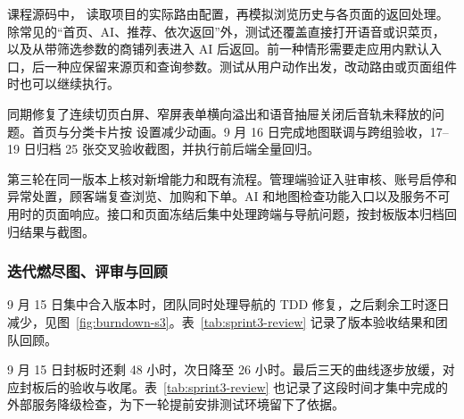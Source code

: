 课程源码中， 读取项目的实际路由配置，再模拟浏览历史与各页面的返回处理。除常见的“首页、AI、推荐、依次返回”外，测试还覆盖直接打开语音或识菜页，以及从带筛选参数的商铺列表进入 AI 后返回。前一种情形需要走应用内默认入口，后一种应保留来源页和查询参数。测试从用户动作出发，改动路由或页面组件时也可以继续执行。

同期修复了连续切页白屏、窄屏表单横向溢出和语音抽屉关闭后音轨未释放的问题。首页与分类卡片按  设置减少动画。9 月 16 日完成地图联调与跨组验收，17--19 日归档 25 张交叉验收截图，并执行前后端全量回归。

第三轮在同一版本上核对新增能力和既有流程。管理端验证入驻审核、账号启停和异常处置，顾客端复查浏览、加购和下单。AI 和地图检查功能入口以及服务不可用时的页面响应。接口和页面冻结后集中处理跨端与导航问题，按封板版本归档回归结果与截图。

\subsubsection{迭代燃尽图、评审与回顾}
9 月 15 日集中合入版本时，团队同时处理导航的 TDD 修复，之后剩余工时逐日减少，见图~\ref{fig:burndown-s3}。表~\ref{tab:sprint3-review} 记录了版本验收结果和团队回顾。

9 月 15 日封板时还剩 48 小时，次日降至 26 小时。最后三天的曲线逐步放缓，对应封板后的验收与收尾。表~\ref{tab:sprint3-review} 也记录了这段时间才集中完成的外部服务降级检查，为下一轮提前安排测试环境留下了依据。

